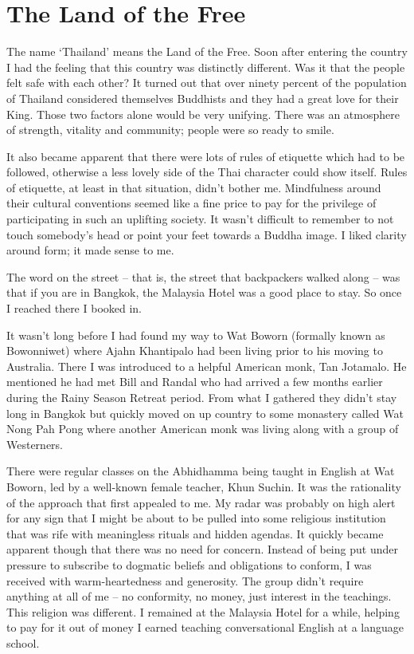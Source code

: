 \chapter{The Land of the Free}

The name `Thailand' means the Land of the Free\cite{free}.
Soon after entering the country I had the feeling
that this country was distinctly different. Was it that the people felt
safe with each other? It turned out that over ninety percent of the
population of Thailand considered themselves Buddhists and they had a
great love for their King. Those two factors alone would be very unifying.
There was an atmosphere of strength, vitality and community; people were
so ready to smile.

It also became apparent that there were lots of rules of etiquette which
had to be followed, otherwise a less lovely side of the Thai character
could show itself. Rules of etiquette, at least in that situation,
didn't bother me. Mindfulness around their cultural conventions seemed
like a fine price to pay for the privilege of participating in such an
uplifting society. It wasn't difficult to remember to not touch
somebody's head or point your feet towards a Buddha image. I liked
clarity around form; it made sense to me.

The word on the street -- that is, the street that backpackers walked
along -- was that if you are in Bangkok, the Malaysia Hotel was a good
place to stay. So once I reached there I booked in.

It wasn't long before I had found my way to Wat Boworn (formally known as
Bowonniwet) where Ajahn Khantipalo had been living prior to
his moving to Australia. There I was introduced to a helpful American
monk, Tan Jotamalo. He mentioned he had met Bill and Randal who had
arrived a few months earlier during the Rainy Season Retreat period.
From what I gathered they didn't stay long in Bangkok but quickly moved
on up country to some monastery called Wat Nong Pah Pong where another
American monk was living along with a group of Westerners.

There were regular classes on the Abhidhamma being taught in English at
Wat Boworn, led by a well-known female teacher, Khun Suchin. It was the
rationality of the approach that first appealed to me. My radar was
probably on high alert for any sign that I might be about to be pulled
into some religious institution that was rife with meaningless rituals
and hidden agendas. It quickly became apparent though that there was no
need for concern. Instead of being put under pressure to subscribe to
dogmatic beliefs and obligations to conform, I was received with
warm-heartedness and generosity. The group didn't require anything at
all of me -- no conformity, no money, just interest in the teachings.
This religion was different. I remained at the Malaysia Hotel for a
while, helping to pay for it out of money I earned teaching
conversational English at a language school.

